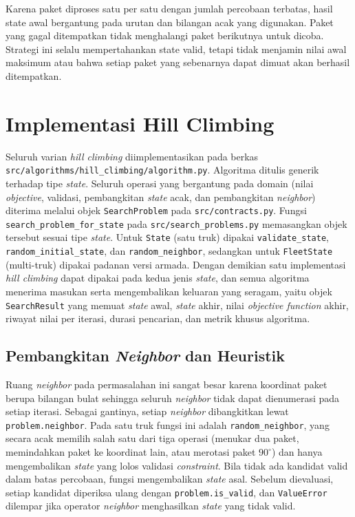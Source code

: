 Karena paket diproses satu per satu dengan jumlah percobaan terbatas, hasil state awal bergantung pada urutan dan bilangan acak yang digunakan. Paket yang gagal ditempatkan tidak menghalangi paket berikutnya untuk dicoba. Strategi ini selalu mempertahankan state valid, tetapi tidak menjamin nilai awal maksimum atau bahwa setiap paket yang sebenarnya dapat dimuat akan berhasil ditempatkan.

\section{Implementasi Hill Climbing}

Seluruh varian \textit{hill climbing} diimplementasikan pada berkas \texttt{src/\allowbreak algorithms/\allowbreak hill\_\allowbreak climbing/\allowbreak algorithm.py}. Algoritma ditulis generik terhadap tipe \textit{state}. Seluruh operasi yang bergantung pada domain (nilai \textit{objective}, validasi, pembangkitan \textit{state} acak, dan pembangkitan \textit{neighbor}) diterima melalui objek \texttt{SearchProblem} pada \texttt{src/\allowbreak contracts.py}. Fungsi \texttt{search\_problem\_for\_state} pada \texttt{src/\allowbreak search\_problems.py} memasangkan objek tersebut sesuai tipe \textit{state}. Untuk \texttt{State} (satu truk) dipakai \texttt{validate\_state}, \texttt{random\_initial\_state}, dan \texttt{random\_neighbor}, sedangkan untuk \texttt{FleetState} (multi-truk) dipakai padanan versi armada. Dengan demikian satu implementasi \textit{hill climbing} dapat dipakai pada kedua jenis \textit{state}, dan semua algoritma menerima masukan serta mengembalikan keluaran yang seragam, yaitu objek \texttt{SearchResult} yang memuat \textit{state} awal, \textit{state} akhir, nilai \textit{objective function} akhir, riwayat nilai per iterasi, durasi pencarian, dan metrik khusus algoritma.

\subsection{Pembangkitan \textit{Neighbor} dan Heuristik}
Ruang \textit{neighbor} pada permasalahan ini sangat besar karena koordinat paket berupa bilangan bulat sehingga seluruh \textit{neighbor} tidak dapat dienumerasi pada setiap iterasi. Sebagai gantinya, setiap \textit{neighbor} dibangkitkan lewat \texttt{problem.neighbor}. Pada satu truk fungsi ini adalah \texttt{random\_neighbor}, yang secara acak memilih salah satu dari tiga operasi (menukar dua paket, memindahkan paket ke koordinat lain, atau merotasi paket $90^{\circ}$) dan hanya mengembalikan \textit{state} yang lolos validasi \textit{constraint}. Bila tidak ada kandidat valid dalam batas percobaan, fungsi mengembalikan \textit{state} asal. Sebelum dievaluasi, setiap kandidat diperiksa ulang dengan \texttt{problem.is\_valid}, dan \texttt{ValueError} dilempar jika operator \textit{neighbor} menghasilkan \textit{state} yang tidak valid.

